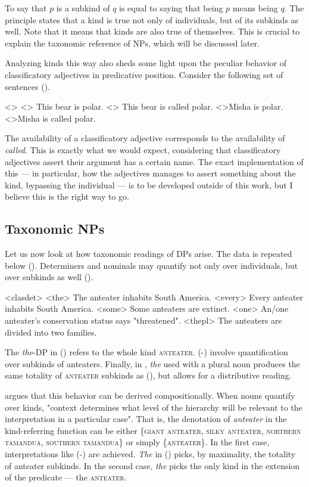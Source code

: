 \documentclass[a4paper, 12pt]{article}
\begin{document}
To say that $p$ is a subkind of $q$ is equal to saying that being $p$ means being $q$. The principle states that a kind is true not only of individuals, but of its subkinds as well. Note that it means that kinds are also true of themselves. This is crucial to explain the taxonomic reference of NPs, which will be discussed later.

Analyzing kinds this way also sheds some light upon the peculiar behavior of classificatory adjectives in predicative position. Consider the following set of sentences (\nextx).

\pex<>
    \a<> This bear is polar.
    \a<> This bear is called polar.
    \a<>\ljudge*Misha is polar.
    \a<>\ljudge*Misha is called polar.
\xe

The availability of a classificatory adjective corresponds to the availability of \textit{called}. This is exactly what we would expect, considering that classificatory adjectives assert their argument has a certain name. The exact implementation of this --- in particular, how the adjectives manages to assert something about the kind, bypassing the individual --- is to be developed outside of this work, but I believe this is the right way to go.

\subsection{Taxonomic NPs}

Let us now look at how taxonomic readings of DPs arise. The data is repeated below (\nextx). Determiners and nominals may quantify not only over individuals, but over subkinds as well (\nextx).

\pex<clasdet>
    \a<the> The anteater inhabits South America.
    \a<every> Every anteater inhabits South America.
    \a<some> Some anteaters are extinct.
    \a<one> An/one anteater's conservation status says "threatened".
    \a<thepl> The anteaters are divided into two families.
\xe

The \textit{the}-DP in () refers to the whole kind \textsc{anteater}. (-) involve quantification over subkinds of anteaters. Finally, in , \textit{the} used with a plural noun produces the same totality of \textsc{anteater} subkinds as (), but allows for a distributive reading.

\textcite{dayal2004numbermarkingdefiniteness} argues that this behavior can be derived compositionally. When nouns quantify over kinds, "context determines what level of the hierarchy will be relevant to the interpretation in a particular case". That is, the denotation of \textit{anteater} in the kind-referring function can be either \{\textsc{giant anteater, silky anteater, northern tamandua, southern tamandua}\} or simply \{\textsc{anteater}\}. In the first case, interpretations like (-) are achieved. \textit{The} in () picks, by maximality, the totality of anteater subkinds. In the second case, \textit{the} picks the only kind in the extension of the predicate --- the \textsc{anteater}.
\end{document}
